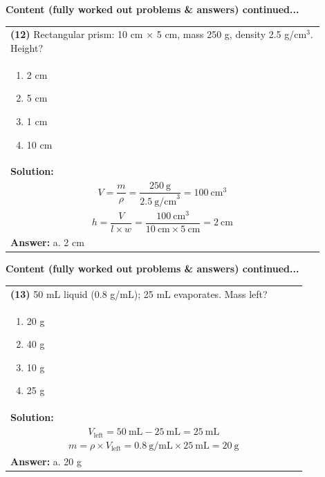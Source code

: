 \documentclass{article}
\begin{document}
{\newpage
\noindent
{\large\textbf{Content (fully worked out problems \& answers) continued...}}\\[0.2em]
\vspace{0.2cm}
\begin{tabular}{|p{0.9\linewidth}|}
\hline
\vspace{0.2cm}
\textbf{(12)} Rectangular prism: 10 cm × 5 cm, mass 250 g, density 2.5 g/cm$^3$. Height? \\
\begin{minipage}[t]{0.85\linewidth}
\begin{enumerate}[label=\alph*.]
   \item 2 cm
   \item 5 cm
   \item 1 cm
   \item 10 cm
\end{enumerate}
\end{minipage}\\
\hline
\vspace{0.2cm}
\textbf{Solution:} \\
\[
V = \frac{m}{\rho} = \frac{250~\text{g}}{2.5~\text{g/cm}^3} = 100~\text{cm}^3
\] \\
\[
h = \frac{V}{l \times w} = \frac{100~\text{cm}^3}{10~\text{cm} \times 5~\text{cm}} = 2~\text{cm}
\] \\ 
\hline
\vspace{0.2cm}
\textbf{Answer:} a. 2 cm \\
\hline
\end{tabular}

\newpage
\noindent
{\large\textbf{Content (fully worked out problems \& answers) continued...}}\\[0.2em]
\vspace{0.2cm}
\begin{tabular}{|p{0.9\linewidth}|}
\hline
\vspace{0.2cm}
\textbf{(13)} 50 mL liquid (0.8 g/mL); 25 mL evaporates. Mass left? \\
\begin{minipage}[t]{0.85\linewidth}
\begin{enumerate}[label=\alph*.]
   \item 20 g
   \item 40 g
   \item 10 g
   \item 25 g
\end{enumerate}
\end{minipage}\\
\hline
\vspace{0.2cm}
\textbf{Solution:} \\
\[
V_\text{left} = 50~\text{mL} - 25~\text{mL} = 25~\text{mL}
\] \\
\[
m = \rho \times V_\text{left} = 0.8~\text{g/mL} \times 25~\text{mL} = 20~\text{g}
\] \\ 
\hline
\vspace{0.2cm}
\textbf{Answer:} a. 20 g \\
\hline
\end{tabular}

}
\end{document}
